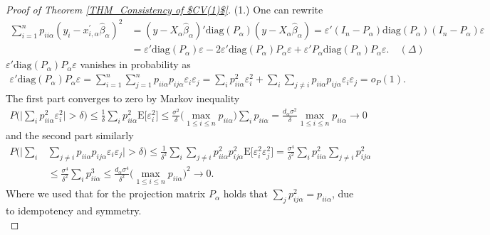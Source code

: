 \documentclass[Research_Module_ES.tex]{subfiles}
\begin{document}
\begin{proof}[Proof of Theorem \ref{THM_Consistency of $CV(1)$}]
	(1.) One can rewrite 
	\begin{align*}
	\sum_{i=1}^n p_{ii\alpha}(y_i-x_{i,\alpha}^\prime\hat{\beta}_\alpha)^2 &= (y-X_\alpha\hat{\beta}_\alpha)'\mathrm{diag}(P_\alpha)(y-X_\alpha\hat{\beta}_\alpha) 
	= \varepsilon'(I_n-P_\alpha)\mathrm{diag}(P_\alpha)(I_n-P_\alpha)\varepsilon\\
	&= \varepsilon'\mathrm{diag}(P_\alpha)\varepsilon-2\varepsilon'\mathrm{diag}(P_\alpha)P_\alpha\varepsilon+\varepsilon'P_\alpha\mathrm{diag}(P_\alpha)P_\alpha \varepsilon. \quad (\Delta)
	\end{align*}
	$\varepsilon'\mathrm{diag}(P_\alpha)P_\alpha\varepsilon$ vanishes in probability as
	\begin{align*}
	\varepsilon'\mathrm{diag}(P_\alpha)P_\alpha\varepsilon= \sum_{i=1}^n\sum_{j=1}^np_{ii\alpha}p_{ij\alpha}\varepsilon_i\varepsilon_j
	=\sum_{i}p_{ii\alpha}^2\varepsilon_i^2 + \sum_{i}\sum_{j\neq i}p_{ii\alpha}p_{ij\alpha}\varepsilon_i\varepsilon_j=o_P(1).
	\end{align*}
	The first part converges to zero by Markov inequality 
	\begin{align*}
	P\biggl(\biggl|\sum_{i}p_{ii\alpha}^2\varepsilon_i^2\biggr|>\delta\biggr)
	\le \frac{1}{\delta}\sum_{i}p_{ii\alpha}^2\mathrm{E}\bigl[\varepsilon_i^2\bigr]
	\le \frac{\sigma^2}{\delta}\biggl(\max_{1\le i\le n}p_{ii\alpha}\biggr) \sum_{i}p_{ii\alpha} 
	= \frac{d_\alpha\sigma^2}{\delta}\max_{1\le i\le n}p_{ii\alpha} \to 0 
	\end{align*}
	and the second part similarly 
	\begin{align*}
	P\biggl(\biggl|\sum_{i}&\sum_{j\neq i}p_{ii\alpha}p_{ij\alpha}\varepsilon_i\varepsilon_j\biggr|>\delta\biggr)\le\frac{1}{\delta^2}\sum_{i}\sum_{j\neq i}p_{ii\alpha}^2p_{ij\alpha}^2\mathrm{E}\bigl[\varepsilon_i^2\varepsilon_j^2\bigr]
	= \frac{\sigma^4}{\delta^2}\sum_{i}p_{ii\alpha}^2\sum_{j\neq i}p_{ij\alpha}^2\\
	&\le \frac{\sigma^4}{\delta^2}\sum_{i}p_{ii\alpha}^3 \le \frac{d_\alpha\sigma^4}{\delta^2}\biggl(\max_{1\le i\le n}p_{ii\alpha}\biggr)^2 \to 0.
	\end{align*}
	Where we used that for the projection matrix $P_\alpha$ holds that
	$\sum_{j}p_{ij\alpha}^2=p_{ii\alpha}$, due to idempotency and symmetry.\\
	

\end{proof}
\end{document}
